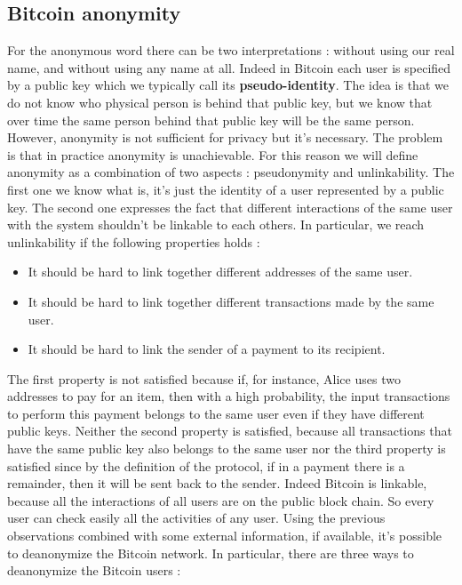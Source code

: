 \subsection{Bitcoin anonymity}
For the anonymous word there can be two interpretations : without using our real name, and without using any name at all. Indeed in Bitcoin each user is specified by a public key which we typically call its \textbf{pseudo-identity}. The idea is that we do not know who physical person is behind that public key, but we know that over time the same person behind that public key will be the same person. However, anonymity is not sufficient for privacy but it's necessary. The problem is that in practice anonymity is unachievable. For this reason we will define anonymity as a combination of two aspects : pseudonymity and unlinkability. The first one we know what is, it's just the identity of a user represented by a public key. The second one expresses the fact that different interactions of the same user with the system shouldn't be linkable to each others. In particular, we reach unlinkability if the following properties holds :
\begin{itemize}
\item It should be hard to link together different addresses of the same user.
\item It should be hard to link together different transactions made by the same user.
\item It should be hard to link the sender of a payment to its recipient.
\end{itemize}
The first property is not satisfied because if, for instance, Alice uses two addresses to pay for an item, then with a high probability, the input transactions to perform this payment belongs to the same user even if they have different public keys. Neither the second property is satisfied, because all transactions that have the same public key also belongs to the same user nor the third property is satisfied since by the definition of the protocol, if in a payment there is a remainder, then it will be sent back to the sender. Indeed Bitcoin is linkable, because all the interactions of all users are on the public block chain. So every user can check easily all the activities of any user. Using the previous observations combined with some external information, if available, it's possible to deanonymize the Bitcoin network. In particular, there are three ways to deanonymize the Bitcoin users :
